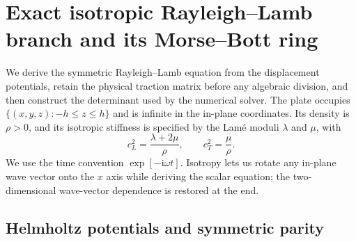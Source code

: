 
\section{Exact isotropic Rayleigh--Lamb branch and its Morse--Bott ring}
\label{sec:isotropic-rayleigh-lamb-derivation}

We derive the symmetric Rayleigh--Lamb equation from the displacement
potentials, retain the physical traction matrix before any algebraic
division, and then construct the determinant used by the numerical solver.
The plate occupies
\(
  \{(x,y,z):-h\leq z\leq h\}
\)
and is infinite in the in-plane coordinates.  Its density is \(\rho>0\),
and its isotropic stiffness is specified by the Lam\'e moduli \(\lambda\)
and \(\mu\), with
\begin{equation}
  c_L^2=\frac{\lambda+2\mu}{\rho},
  \qquad
  c_T^2=\frac{\mu}{\rho}.
  \label{eq:isotropic-wave-speeds}
\end{equation}
We use the time convention \(\exp[-\mathrm{i}\omega t]\).  Isotropy lets us
rotate any in-plane wave vector onto the \(x\) axis while deriving the scalar
equation; the two-dimensional wave-vector dependence is restored at the end.

\subsection{Helmholtz potentials and symmetric parity}

